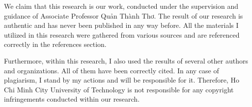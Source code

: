 \documentclass[12pt,a4paper,oneside]{book} %
\begin{document}

\coverpage

\frontmatter


\begin{declaration}




We claim that this research is our work, conducted under the supervision and guidance of Associate Professor Quản Thành Thơ. The result of our research is authentic and has never been published in any way before. All the materials I utilized in this research were gathered from various sources and are referenced correctly in the references section. 

Furthermore, within this research, I also used the results of several other authors and organizations. All of them have been correctly cited. In any case of plagiarism, I stand by my actions and will be responsible for it. Therefore, Ho Chi Minh City University of Technology is not responsible for any copyright infringements conducted within our research.

\end{declaration}
\end{document}

